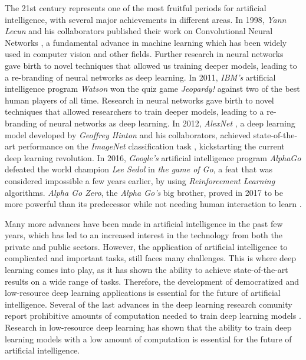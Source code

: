 The 21st century represents one of the most fruitful periods for artificial intelligence, with several major achievements in different areas. In 1998, \textit{Yann Lecun} and his collaborators published their work on Convolutional Neural Networks \cite{lecun1999}, a fundamental advance in machine learning which has been widely used in computer vision and other fields. Further research in neural networks \cite{hinton2006, hinton2012} gave birth to novel techniques that allowed us training deeper models, leading to a re-branding of neural networks as deep learning. In 2011, \textit{IBM's} artificial intelligence program \textit{Watson} won the quiz game \textit{Jeopardy!} against two of the best human players of all time. Research in neural networks gave birth to novel techniques that allowed researchers to train deeper models, leading to a re-branding of neural networks as deep learning. In 2012, \textit{AlexNet} \cite{krizhevsky2012}, a deep learning model developed by \textit{Geoffrey Hinton} and his collaborators, achieved state-of-the-art performance on the \textit{ImageNet} classification task \cite{ILSVRC15}, kickstarting the current deep learning revolution. In 2016, \textit{Google's} artificial intelligence program \textit{AlphaGo} \cite{silver2016} defeated the world champion \textit{Lee Sedol} in \textit{the game of Go}, a feat that was considered impossible a few years earlier, by using \textit{Reinforcement Learning} algorithms. \textit{Alpha Go Zero}, the \textit{Alpha Go's} big brother, proved in 2017 to be more powerful than its predecessor while not needing human interaction to learn \cite{Silver2017a, Silver2017b}.

Many more advances have been made in artificial intelligence in the past few years, which has led to an increased interest in the technology from both the private and public sectors. However, the application of artificial intelligence to complicated and important tasks, still faces many challenges. This is where deep learning comes into play, as it has shown the ability to achieve state-of-the-art results on a wide range of tasks. Therefore, the development of democratized and low-resource deep learning applications is essential for the future of artificial intelligence. Several of the last advances in the deep learning research comunity report prohibitive amounts of computation needed to train deep learning models \cite{silver2016, kechyn2018, floridi2020}. Research in low-resource deep learning \cite{howard2017, Han2017, Gao2018, sanchez2020, so2021} has shown that the ability to train deep learning models with a low amount of computation is essential for the future of artificial intelligence.


